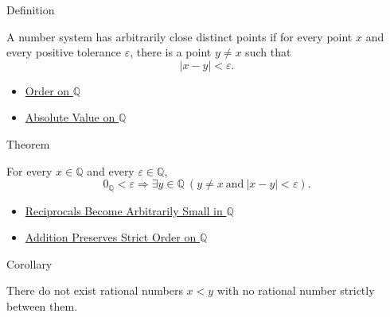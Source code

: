 \begin{definitionbox}{Definition}
\begin{definition}
\label{def:arbitrarily-close-distinct-points}
A number system has arbitrarily close distinct points if for every point $x$
and every positive tolerance $\varepsilon$, there is a point $y\ne x$ such that
\[
|x-y|<\varepsilon.
\]
\end{definition}
\end{definitionbox}

\begin{dependencies}
\begin{itemize}
  \item \hyperref[def:order-on-q]{Order on $\mathbb{Q}$}
  \item \hyperref[def:absolute-value-on-q]{Absolute Value on $\mathbb{Q}$}
\end{itemize}
\end{dependencies}

\begin{theorembox}{Theorem}
\begin{theorem}
\label{thm:q-has-arbitrarily-close-distinct-points}
For every $x\in\mathbb{Q}$ and every $\varepsilon\in\mathbb{Q}$,
\[
0_{\mathbb{Q}}<\varepsilon
\Longrightarrow
\exists y\in\mathbb{Q}\ (y\ne x\ \text{and}\ |x-y|<\varepsilon).
\]
\end{theorem}
\end{theorembox}

\begin{dependencies}
\begin{itemize}
  \item \hyperref[cor:reciprocals-arbitrarily-small-q]{Reciprocals Become Arbitrarily Small in $\mathbb{Q}$}
  \item \hyperref[thm:addition-preserves-strict-order-on-q]{Addition Preserves Strict Order on $\mathbb{Q}$}
\end{itemize}
\end{dependencies}

\begin{corollarybox}{Corollary}
\begin{corollary}
\label{cor:q-has-no-adjacent-points}
There do not exist rational numbers $x<y$ with no rational number strictly
between them.
\end{corollary}
\end{corollarybox}

